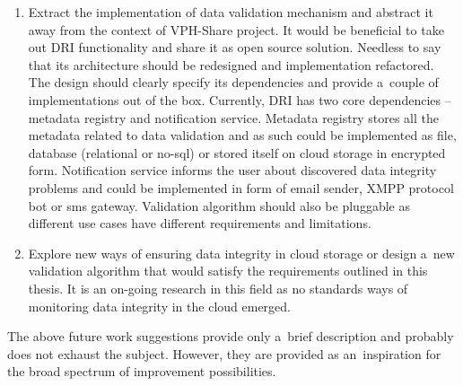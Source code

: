 \begin{enumerate}
\item Extract the implementation of data validation mechanism and abstract it away
from the context of VPH-Share project. It would be beneficial to take out DRI
functionality and share it as open source solution. Needless to say that its architecture
should be redesigned and implementation refactored. The design should clearly specify
its dependencies and provide a~couple of implementations out of the box. Currently,
DRI has two core dependencies -- metadata registry and notification service. Metadata
registry stores all the metadata related to data validation and as such could be
implemented as file, database (relational or no-sql) or stored itself on cloud storage
in encrypted form. Notification service informs the user about discovered data integrity
problems and could be implemented in form of email sender, XMPP protocol bot or sms
gateway. Validation algorithm should also be pluggable as different use cases have 
different requirements and limitations.

\item Explore new ways of ensuring data integrity in cloud storage or design a~new
validation algorithm that would satisfy the requirements outlined in this thesis. It is
an on-going research in this field as no standards ways of monitoring data integrity in
the cloud emerged.
\end{enumerate}

The above future work suggestions provide only a~brief description and probably does
not exhaust the subject. However, they are provided as an~inspiration for the broad
spectrum of improvement possibilities.
